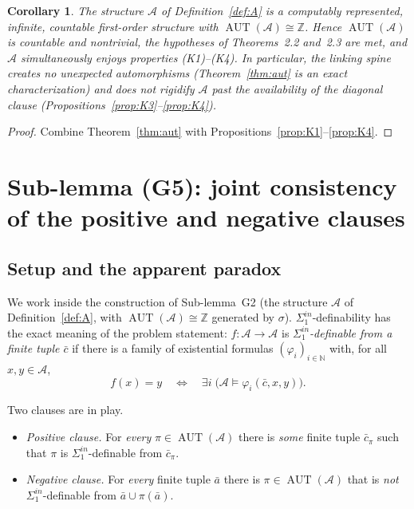 \documentclass[12pt,fullpage]{article}
\newtheorem{corollary}[theorem]{Corollary}
\theoremstyle{definition}
\newcommand{\A}{\mathcal{A}}
\newcommand{\N}{\mathbb{N}}
\newcommand{\Z}{{\mathbb{Z}}}
\newcommand{\AUT}{\operatorname{AUT}}
\renewcommand{\phi}{\varphi}
\begin{document}
\begin{corollary}\label{cor:G2}
The structure $\A$ of Definition~\ref{def:A} is a computably represented,
infinite, countable first-order structure with $\AUT(\A)\cong\Z$.  Hence
$\AUT(\A)$ is countable and nontrivial, the hypotheses of Theorems~2.2
and~2.3 are met, and $\A$ simultaneously enjoys properties
(K1)--(K4).  In particular, the linking spine creates no unexpected
automorphisms (Theorem~\ref{thm:aut} is an exact characterization) and does
not rigidify $\A$ past the availability of the diagonal clause
(Propositions~\ref{prop:K3}--\ref{prop:K4}).
\end{corollary}

\begin{proof}
Combine Theorem~\ref{thm:aut} with
Propositions~\ref{prop:K1}--\ref{prop:K4}.
\end{proof}

\section*{Sub-lemma (G5): joint consistency of the positive and negative clauses}

\subsection*{Setup and the apparent paradox}

We work inside the construction of Sub-lemma~G2 (the structure $\A$ of
Definition~\ref{def:A}, with $\AUT(\A)\cong\Z$ generated by $\sigma$).
$\Sigma^{in}_1$-definability has the exact meaning of the problem statement:
$f\colon\A\to\A$ is \emph{$\Sigma^{in}_1$-definable from a finite tuple
$\bar c$} if there is a family of existential formulas $(\phi_i)_{i\in\N}$
with, for all $x,y\in\A$,
\[
f(x)=y\quad\Longleftrightarrow\quad \exists i\;\bigl(\A\models\phi_i(\bar c,x,y)\bigr).
\tag{$\ast$}
\]

Two clauses are in play.
\begin{itemize}
\item[(P1)] \emph{Positive clause.} For \emph{every} $\pi\in\AUT(\A)$ there is
  \emph{some} finite tuple $\bar c_\pi$ such that $\pi$ is
  $\Sigma^{in}_1$-definable from $\bar c_\pi$.
\item[(P2)] \emph{Negative clause.} For \emph{every} finite tuple $\bar a$
  there is $\pi\in\AUT(\A)$ that is \emph{not} $\Sigma^{in}_1$-definable from
  $\bar a\cup\pi(\bar a)$.
\end{itemize}
\end{document}
